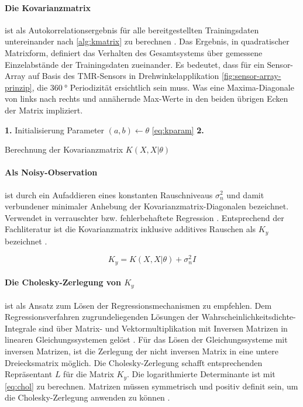 \paragraph*{Die Kovarianzmatrix} ist als Autokorrelationsergebnis für alle bereitgestellten Trainingsdaten untereinander nach \autoref{alg:kmatrix} zu berechnen \cite{Rasmussen2006}. Das Ergebnis, in quadratischer Matrixform, definiert das Verhalten des Gesamtsystems über gemessene Einzelabstände der Trainingsdaten zueinander. Es bedeutet, dass für ein Sensor-Array auf Basis des TMR-Sensors \cite{TDK2016} in Drehwinkelapplikation \autoref{fig:sensor-array-prinzip}, die $\SI{360}{\degree}$ Periodizität ersichtlich sein muss. Was eine Maxima-Diagonale von links nach rechts und annähernde Max-Werte in den beiden übrigen Ecken der Matrix impliziert.


\begin{algorithm}[h]
	\SetAlgoLined
	\textbf{1.} Initialisierung Parameter $(a,b) \leftarrow \theta$ \autoref{eq:kparam}\;
	\textbf{2.} 
	\caption{Berechnung der Kovarianzmatrix $K(X, X|\theta)$}
	\label{alg:kmatrix}
\end{algorithm}


\paragraph*{Als Noisy-Observation} ist durch ein Aufaddieren eines konstanten Rauschniveaus $\sigma_n^2$ und damit verbundener minimaler Anhebung der Kovarianzmatrix-Diagonalen bezeichnet. Verwendet in verrauschter bzw. fehlerbehaftete Regression \cite{Rasmussen2006}. Entsprechend der Fachliteratur ist die Kovarianzmatrix inklusive additives Rauschen als $K_y$ bezeichnet \cite{Rasmussen2006}.


\begin{equation}\label{eq:addnoise}
	K_y = K(X, X|\theta) + \sigma_n^2 I
\end{equation}


\paragraph*{Die Cholesky-Zerlegung von $K_y$} ist als Ansatz zum Lösen der Regressionsmechanismen zu empfehlen. Dem Regressionsverfahren zugrundeliegenden Lösungen der Wahrscheinlichkeitsdichte-Integrale sind über Matrix- und Vektormultiplikation mit Inversen Matrizen in linearen Gleichungssystemen gelöst \cite{Rasmussen2006}. Für das Lösen der Gleichungssysteme mit inversen Matrizen, ist die Zerlegung der nicht inversen Matrix in eine untere Dreiecksmatrix möglich. Die Cholesky-Zerlegung schafft entsprechenden Repräsentant $L$ für die Matrix $K_y$. Die logarithmierte Determinante ist mit \autoref{eq:chol} zu berechnen. Matrizen müssen symmetrisch und positiv definit sein, um die Cholesky-Zerlegung anwenden zu können \cite{Rasmussen2006}.


